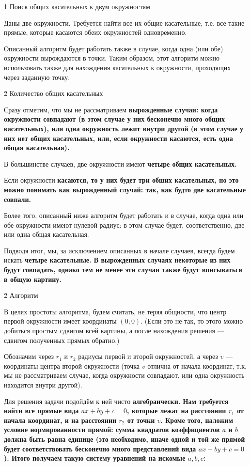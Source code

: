 \h1{ Поиск общих касательных к двум окружностям }

Даны две окружности. Требуется найти все их общие касательные, т.е. все такие прямые, которые касаются обеих окружностей одновременно.

Описанный алгоритм будет работать также в случае, когда одна (или обе) окружности вырождаются в точки. Таким образом, этот алгоритм можно использовать также для нахождения касательных к окружности, проходящих через заданную точку.


\h2{ Количество общих касательных }

Сразу отметим, что мы не рассматриваем \bf{вырожденные} случаи: когда окружности совпадают (в этом случае у них бесконечно много общих касательных), или одна окружность лежит внутри другой (в этом случае у них нет общих касательных, или, если окружности касаются, есть одна общая касательная).

В большинстве случаев, две окружности имеют \bf{четыре} общих касательных.

Если окружности \bf{касаются}, то у них будет три обших касательных, но это можно понимать как вырожденный случай: так, как будто две касательные совпали.

Более того, описанный ниже алгоритм будет работать и в случае, когда одна или обе окружности имеют нулевой радиус: в этом случае будет, соответственно, две или одна общая касательная.

Подводя итог, мы, за исключением описанных в начале случаев, всегда будем искать \bf{четыре касательные}. В вырожденных случаях некоторые из них будут совпадать, однако тем не менее эти случаи также будут вписываться в общую картину.


\h2{ Алгоритм }

В целях простоты алгоритма, будем считать, не теряя общности, что центр первой окружности имеет координаты $(0;0)$. (Если это не так, то этого можно добиться простым сдвигом всей картины, а после нахождения решения --- сдвигом полученных прямых обратно.)

Обозначим через $r_1$ и $r_2$ радиусы первой и второй окружностей, а через $v$ --- координаты центра второй окружности (точка $v$ отлична от начала координат, т.к. мы не рассматриваем случае, когда окружности совпадают, или одна окружность находится внутри другой).

Для решения задачи подойдём к ней чисто \bf{алгебраически}. Нам требуется найти все прямые вида $ax+by+c=0$, которые лежат на расстоянии $r_1$ от начала координат, и на расстоянии $r_2$ от точки $v$. Кроме того, наложим условие нормированности прямой: сумма квадратов коэффициентов $a$ и $b$ должна быть равна единице (это необходимо, иначе одной и той же прямой будет соответствовать бесконечно много представлений вида $ax+by+c=0$). Итого получаем такую систему уравнений на искомые $a,b,c$:

